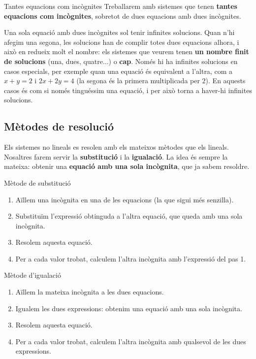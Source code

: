 \begin{nota}{Tantes equacions com incògnites}
Treballarem amb sistemes que tenen \textbf{tantes equacions com incògnites}, sobretot de dues equacions amb dues incògnites.

Una sola equació amb dues incògnites sol tenir infinites solucions. Quan n'hi afegim una segona, les solucions han de complir totes dues equacions alhora, i això en redueix molt el nombre: els sistemes que veurem tenen \textbf{un nombre finit de solucions} (una, dues, quatre...) o \textbf{cap}. Només hi ha infinites solucions en casos especials, per exemple quan una equació és equivalent a l'altra, com a $x+y=2$ i $2x+2y=4$ (la segona és la primera multiplicada per $2$). En aquests casos és com si només tinguéssim una equació, i per això torna a haver-hi infinites solucions.
\end{nota}

\subsection{Mètodes de resolució}

Els sistemes no lineals es resolen amb els mateixos mètodes que els lineals. Nosaltres farem servir la \textbf{substitució} i la \textbf{igualació}. La idea és sempre la mateixa: obtenir una \textbf{equació amb una sola incògnita}, que ja sabem resoldre.

\begin{propietat}{Mètode de substitució}
\begin{enumerate}
\item Aïllem una incògnita en una de les equacions (la que sigui més senzilla).
\item Substituïm l'expressió obtinguda a l'altra equació, que queda amb una sola incògnita.
\item Resolem aquesta equació.
\item Per a cada valor trobat, calculem l'altra incògnita amb l'expressió del pas 1.
\end{enumerate}
\end{propietat}

\begin{propietat}{Mètode d'igualació}
\begin{enumerate}
\item Aïllem la mateixa incògnita a les dues equacions.
\item Igualem les dues expressions: obtenim una equació amb una sola incògnita.
\item Resolem aquesta equació.
\item Per a cada valor trobat, calculem l'altra incògnita amb qualsevol de les dues expressions.
\end{enumerate}
\end{propietat}

